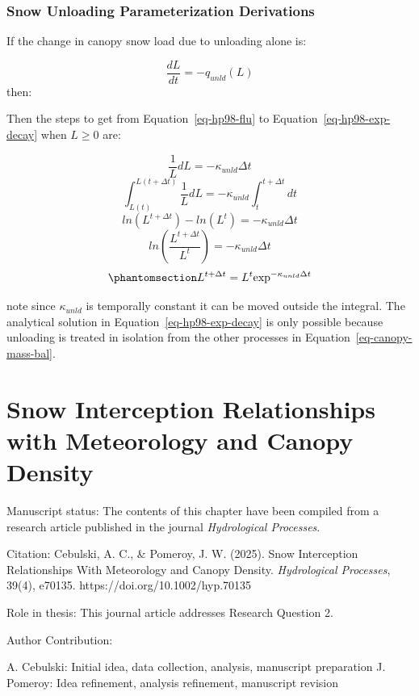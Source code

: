 \documentclass[
  letterpaper,
]{tex/uofsthesis-cs}
\begin{document}
\subsection{Snow Unloading Parameterization
Derivations}\label{snow-unloading-parameterization-derivations}

If the change in canopy snow load due to unloading alone is:

\[
 \frac{d L}{d t} =-q_{unld}(L)
\] then:

Then the steps to get from Equation~\ref{eq-hp98-flu} to
Equation~\ref{eq-hp98-exp-decay} when \(L \ge 0\) are:

\[\frac{1}{L} d L = -\kappa_{unld} \Delta t\]
\[\int^{L(t+\Delta t)}_{L(t)}\frac{1}{L} dL = -\kappa_{unld}\int^{t+\Delta t}_tdt \]
\[ln(L^{t+\Delta t}) - ln(L^t) = -\kappa_{unld} \Delta t \]
\[ ln \left( \frac{L^{t+\Delta t}}{L^t}\right) = -\kappa_{unld}\Delta t\]
\begin{equation}\phantomsection\label{eq-unloading-integration-steps}{L^{t+\Delta t} = L^t \text{exp}^{-\kappa_{unld} \Delta t}}\end{equation}

note since \(\kappa_{unld}\) is temporally constant it can be moved
outside the integral. The analytical solution in
Equation~\ref{eq-hp98-exp-decay} is only possible because unloading is
treated in isolation from the other processes in
Equation~\ref{eq-canopy-mass-bal}.

\pagebreak


\chapter{Snow Interception Relationships with Meteorology and Canopy
Density}\label{snow-interception-relationships-with-meteorology-and-canopy-density}

Manuscript status: The contents of this chapter have been compiled from
a research article published in the journal \emph{Hydrological
Processes}.

Citation: Cebulski, A. C., \& Pomeroy, J. W. (2025). Snow Interception
Relationships With Meteorology and Canopy Density. \emph{Hydrological
Processes}, 39(4), e70135. https://doi.org/10.1002/hyp.70135

Role in thesis: This journal article addresses Research Question 2.

Author Contribution:

A. Cebulski: Initial idea, data collection, analysis, manuscript
preparation J. Pomeroy: Idea refinement, analysis refinement, manuscript
revision
\end{document}
